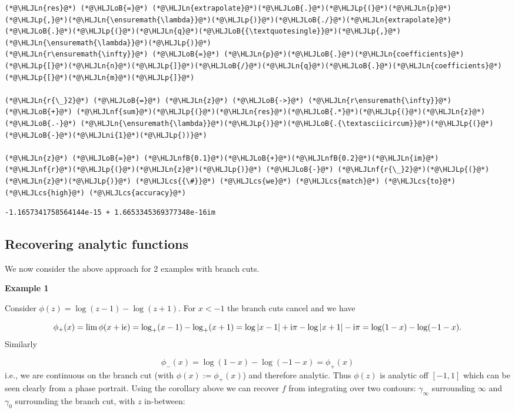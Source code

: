 \documentclass[12pt,a4paper]{article}
\newcommand{\HLJLn}[1]{#1}
\newcommand{\HLJLnf}[1]{\textcolor[RGB]{66,102,213}{#1}}
\newcommand{\HLJLnfB}[1]{\textcolor[RGB]{59,151,46}{#1}}
\newcommand{\HLJLni}[1]{\textcolor[RGB]{59,151,46}{#1}}
\newcommand{\HLJLoB}[1]{\textcolor[RGB]{102,102,102}{\textbf{#1}}}
\newcommand{\HLJLp}[1]{#1}
\newcommand{\HLJLcs}[1]{\textcolor[RGB]{153,153,119}{\textit{#1}}}
\def\I{ {\rm i} }
\begin{document}
\begin{lstlisting}
(*@\HLJLn{res}@*) (*@\HLJLoB{=}@*) (*@\HLJLn{extrapolate}@*)(*@\HLJLoB{.}@*)(*@\HLJLp{(}@*)(*@\HLJLn{p}@*)(*@\HLJLp{,}@*)(*@\HLJLn{\ensuremath{\lambda}}@*)(*@\HLJLp{)}@*)(*@\HLJLoB{./}@*)(*@\HLJLn{extrapolate}@*)(*@\HLJLoB{.}@*)(*@\HLJLp{(}@*)(*@\HLJLn{q}@*)(*@\HLJLoB{{\textquotesingle}}@*)(*@\HLJLp{,}@*)(*@\HLJLn{\ensuremath{\lambda}}@*)(*@\HLJLp{)}@*)
(*@\HLJLn{r\ensuremath{\infty}}@*) (*@\HLJLoB{=}@*) (*@\HLJLn{p}@*)(*@\HLJLoB{.}@*)(*@\HLJLn{coefficients}@*)(*@\HLJLp{[}@*)(*@\HLJLn{n}@*)(*@\HLJLp{]}@*)(*@\HLJLoB{/}@*)(*@\HLJLn{q}@*)(*@\HLJLoB{.}@*)(*@\HLJLn{coefficients}@*)(*@\HLJLp{[}@*)(*@\HLJLn{m}@*)(*@\HLJLp{]}@*)

(*@\HLJLn{r{\_}2}@*) (*@\HLJLoB{=}@*) (*@\HLJLn{z}@*) (*@\HLJLoB{->}@*) (*@\HLJLn{r\ensuremath{\infty}}@*) (*@\HLJLoB{+}@*) (*@\HLJLnf{sum}@*)(*@\HLJLp{(}@*)(*@\HLJLn{res}@*)(*@\HLJLoB{.*}@*)(*@\HLJLp{(}@*)(*@\HLJLn{z}@*) (*@\HLJLoB{.-}@*) (*@\HLJLn{\ensuremath{\lambda}}@*)(*@\HLJLp{)}@*)(*@\HLJLoB{.{\textasciicircum}}@*)(*@\HLJLp{(}@*)(*@\HLJLoB{-}@*)(*@\HLJLni{1}@*)(*@\HLJLp{))}@*)

(*@\HLJLn{z}@*) (*@\HLJLoB{=}@*) (*@\HLJLnfB{0.1}@*)(*@\HLJLoB{+}@*)(*@\HLJLnfB{0.2}@*)(*@\HLJLn{im}@*)
(*@\HLJLnf{r}@*)(*@\HLJLp{(}@*)(*@\HLJLn{z}@*)(*@\HLJLp{)}@*) (*@\HLJLoB{-}@*) (*@\HLJLnf{r{\_}2}@*)(*@\HLJLp{(}@*)(*@\HLJLn{z}@*)(*@\HLJLp{)}@*) (*@\HLJLcs{{\#}}@*) (*@\HLJLcs{we}@*) (*@\HLJLcs{match}@*) (*@\HLJLcs{to}@*) (*@\HLJLcs{high}@*) (*@\HLJLcs{accuracy}@*)
\end{lstlisting}

\begin{lstlisting}
-1.1657341758564144e-15 + 1.6653345369377348e-16im
\end{lstlisting}


\subsection{Recovering analytic functions}
We now consider the above approach for 2 examples with branch cuts.

\textbf{Example 1}

Consider $\phi(z) = \log(z-1) - \log(z+1)$. For $x < -1$ the branch cuts cancel  and we have

\[
\phi_+(x) = \lim \phi(x + \I \epsilon) = \log_+(x-1) - \log_+(x+1) = 
\log|x-1| + \I \pi - \log|x+1| - \I \pi = \log(1-x) - \log(-1-x).
\]
Similarly

\[
\phi_-(x) =  \log(1-x) - \log(-1-x) = \phi_+(x)
\]
i.e., we are continuous on the branch cut (with $\phi(x) := \phi_+(x)$) and therefore analytic. Thus $\phi(z)$ is analytic off $[-1,1]$ which can be seen clearly from a phase portrait. Using the corollary above we can recover $f$ from integrating over two contours: $\gamma_\infty$ surrounding $\infty$  and $\gamma_0$ surrounding the branch cut, with $z$ in-between:
\end{document}
